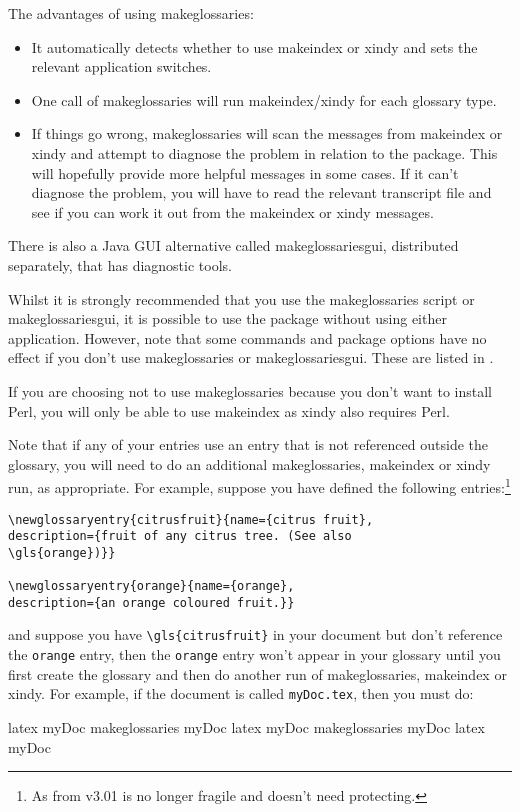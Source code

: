\documentclass[report,inlinetitle]{nlctdoc}
\begin{document}
The advantages of using \gls*{makeglossaries}:
\begin{itemize}
\item It automatically detects whether to use \gls*{makeindex} or
\gls*{xindy} and sets the relevant application switches.

\item One call of \gls*{makeglossaries} will run 
\gls*{makeindex}\slash\gls*{xindy} for each glossary type.

\item If things go wrong, \gls{makeglossaries} will scan the
messages from \gls{makeindex} or \gls{xindy} and attempt to diagnose
the problem in relation to the  package. This
will hopefully provide more helpful messages in some cases. If it
can't diagnose the problem, you will have to read the relevant transcript
file and see if you can work it out from the \gls*{makeindex} or
\gls*{xindy} messages.

\end{itemize}

There is also a Java GUI alternative called \gls{makeglossariesgui},
distributed separately, that has diagnostic tools.

Whilst it is strongly recommended that you use the
\gls{makeglossaries} script or \gls{makeglossariesgui}, it is
possible to use the  package without using either
application. However, note that some commands and package options
have no effect if you don't use \gls*{makeglossaries} or
\gls*{makeglossariesgui}. These are listed in
.

\begin{important}
If you are choosing not to use \gls*{makeglossaries} because you
don't want to install Perl, you will only be able to use
\gls*{makeindex} as \gls*{xindy} also requires Perl.
\end{important}

Note that if any of your entries use an entry
that is not referenced outside the glossary, you will need to
do an additional \gls{makeglossaries}, \gls{makeindex}
or \gls{xindy} run, as appropriate. For example,
suppose you have defined the following entries:\footnote{As from
v3.01  is no longer fragile and doesn't need protecting.}
\begin{verbatim}
\newglossaryentry{citrusfruit}{name={citrus fruit},
description={fruit of any citrus tree. (See also 
\gls{orange})}}

\newglossaryentry{orange}{name={orange},
description={an orange coloured fruit.}}
\end{verbatim}
and suppose you have \verb|\gls{citrusfruit}| in your document
but don't reference the \texttt{orange} entry, then the
\texttt{orange} entry won't appear in your glossary until
you first create the glossary and then do another run
of \gls{makeglossaries}, \gls{makeindex} or \gls{xindy}.
For example, if the document is called \texttt{myDoc.tex}, then
you must do:
\begin{prompt}
latex myDoc
makeglossaries myDoc
latex myDoc
makeglossaries myDoc
latex myDoc
\end{prompt}
\end{document}
